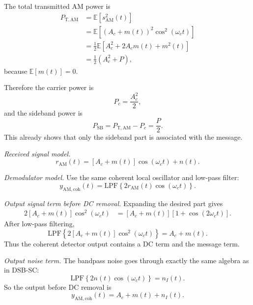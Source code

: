 \begin{tcolorbox}[breakable, colback=cyan!4!white, colframe=cyan!60!black,
title={\textbf{Intuition: Step-by-Step Output SNR Models Under AWGN}}]
The total transmitted AM power is
\begin{align}
P_{\mathrm{T,AM}}
&=
\mathbb{E}[s_{\mathrm{AM}}^2(t)]\nonumber\\
&=
\mathbb{E}\!\left[(A_c+m(t))^2\cos^2(\omega_c t)\right]\nonumber\\
&=
\frac{1}{2}\mathbb{E}\!\left[A_c^2+2A_c m(t)+m^2(t)\right]\nonumber\\
&=
\frac{1}{2}\left(A_c^2+P\right),
\end{align}
because $\mathbb{E}[m(t)]=0$.

Therefore the carrier power is
\begin{equation}
P_c=\frac{A_c^2}{2},
\end{equation}
and the sideband power is
\begin{equation}
P_{\mathrm{SB}}=P_{\mathrm{T,AM}}-P_c=\frac{P}{2}.
\end{equation}
This already shows that only the sideband part is associated with the message.

\emph{Received signal model.}
\begin{equation}
r_{\mathrm{AM}}(t)=\left[A_c+m(t)\right]\cos(\omega_c t)+n(t).
\end{equation}

\emph{Demodulator model.}
Use the same coherent local oscillator and low-pass filter:
\begin{equation}
y_{\mathrm{AM,coh}}(t)=\mathrm{LPF}\left\{2r_{\mathrm{AM}}(t)\cos(\omega_c t)\right\}.
\end{equation}

\emph{Output signal term before DC removal.}
Expanding the desired part gives
\begin{align}
2\left[A_c+m(t)\right]\cos^2(\omega_c t)
&=
\left[A_c+m(t)\right]\left[1+\cos(2\omega_c t)\right].
\end{align}
After low-pass filtering,
\begin{equation}
\mathrm{LPF}\left\{2\left[A_c+m(t)\right]\cos^2(\omega_c t)\right\}
=
A_c+m(t).
\end{equation}
Thus the coherent detector output contains a DC term and the message term.

\emph{Output noise term.}
The bandpass noise goes through exactly the same algebra as in DSB-SC:
\begin{equation}
\mathrm{LPF}\left\{2n(t)\cos(\omega_c t)\right\}=n_I(t).
\end{equation}
So the output before DC removal is
\begin{equation}
y_{\mathrm{AM,coh}}(t)=A_c+m(t)+n_I(t).
\end{equation}


\end{tcolorbox}
